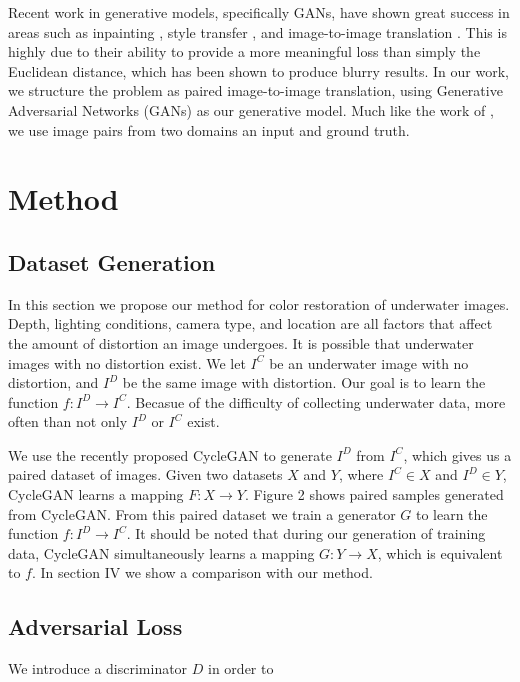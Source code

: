 \documentclass[conference]{IEEEtran}
\begin{document}
Recent work in generative models, specifically GANs, have shown great success
in areas such as inpainting \cite{pathak2016context}, style transfer \cite{Gatys_2016_CVPR}, and image-to-image
translation \cite{isola2016image,zhu2017unpaired}. This is highly due to their ability to provide a more meaningful
loss than simply the Euclidean distance, which has been shown to produce blurry results. In our work, we structure
the problem as paired image-to-image translation, using Generative Adversarial Networks (GANs) as our generative model.
Much like the work of \cite{isola2016image}, we use image pairs from two domains an input and ground truth.

\section{Method}

\subsection{Dataset Generation}
In this section we propose our method for color restoration of underwater images. Depth, lighting conditions, camera
type, and location are all factors that affect the amount of distortion an image undergoes. It is possible that
underwater images with no distortion exist. We let $I^C$ be an underwater image with no distortion, and $I^D$
be the same image with distortion. Our goal is to learn the function $f: I^D \rightarrow I^C$. Becasue of the
difficulty of collecting underwater data, more often than not only $I^D$ or $I^C$ exist.

We use the recently proposed CycleGAN \cite{zhu2017unpaired} to generate $I^D$ from $I^C$, which gives us a paired
dataset of images. Given two datasets $X$ and $Y$, where $I^C \in X$ and $I^D \in Y$, CycleGAN learns a mapping
$F: X \rightarrow Y$. Figure 2 shows paired samples generated from CycleGAN. From this paired dataset we train a
generator $G$ to learn the function $f: I^D \rightarrow I^C$. It should be noted that during our generation of
training data, CycleGAN simultaneously learns a mapping $G: Y \rightarrow X$, which is equivalent to $f$. In section
IV we show a comparison with our method.

\subsection{Adversarial Loss}
We introduce a discriminator $D$ in order to 
\end{document}
